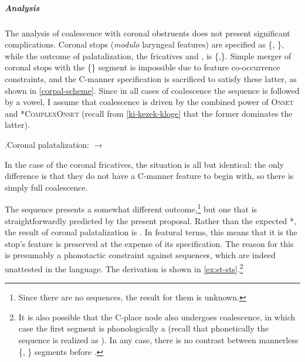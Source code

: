 \subparagraph{Analysis}
\label{sec:analysis-2}

The analysis of coalescence with coronal obstruents does not present significant complications. Coronal stops (\emph{modulo} laryngeal features) are specified as \{, \}, while the outcome of palatalization, \ie the fricatives \ipa{[ʃ]} and \ipa{[ʒ]}, is \{,\}. Simple merger of coronal stops with the \{\} segment is impossible due to feature co-occurrence constraints, and the C-manner specification is sacrificed to satisfy these latter, as shown in \ref{corpal-scheme}. Since in all cases of coalescence the sequence is followed by a vowel, I assume that coalescence is driven by the combined power of \textsc{Onset} and *\textsc{ComplexOnset} (recall from \ref{ki-kezek-kloge} that the former dominates the latter).

\ex.\label{corpal-scheme}Coronal palatalization:  $\rightarrow$ \ipa{[ʒ]}\\

In the case of the coronal fricatives, the situation is all but identical: the only difference is that they do not have a C-manner feature to begin with, so there is simply full coalescence.

The sequence \ipa{[st]} presents a somewhat different outcome,\footnote{Since there are no \ipa{[zd]} sequences, the result for them is unknown.} but one that is straightforwardly predicted by the present proposal. Rather than the expected *\ipa{[sʃ]}, the result of coronal palatalization is \ipa{[sʧ]}. In featural terms, this means that it is the stop's  feature is preserved at the expense of its  specification. The reason for this is presumably a phonotactic constraint against \ipa{[sʃ]} sequences, which are indeed unattested in the language. The derivation is shown in \ref{ex:st-sts}.\footnote{It is also possible that the C-place node also undergoes coalescence, in which case the first segment is phonologically a \ipa{[ʃ]} (recall that phonetically the sequence is realized as ). In any case, there is no contrast between mannerless \{, \} segments before \ipa{[ʧ]}.}

